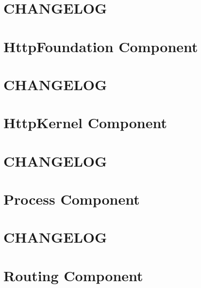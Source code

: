 \documentclass[twoside]{book}
\newcommand{\+}{\discretionary{\mbox{\scriptsize$\hookleftarrow$}}{}{}}
\begin{document}
\chapter{C\+H\+A\+N\+G\+E\+L\+O\+G}
\label{md_vendor_symfony_http-foundation__symfony__component__http_foundation__c_h_a_n_g_e_l_o_g}

\chapter{Http\+Foundation Component}
\label{md_vendor_symfony_http-foundation__symfony__component__http_foundation__r_e_a_d_m_e}

\chapter{C\+H\+A\+N\+G\+E\+L\+O\+G}
\label{md_vendor_symfony_http-kernel__symfony__component__http_kernel__c_h_a_n_g_e_l_o_g}

\chapter{Http\+Kernel Component}
\label{md_vendor_symfony_http-kernel__symfony__component__http_kernel__r_e_a_d_m_e}

\chapter{C\+H\+A\+N\+G\+E\+L\+O\+G}
\label{md_vendor_symfony_process__symfony__component__process__c_h_a_n_g_e_l_o_g}

\chapter{Process Component}
\label{md_vendor_symfony_process__symfony__component__process__r_e_a_d_m_e}

\chapter{C\+H\+A\+N\+G\+E\+L\+O\+G}
\label{md_vendor_symfony_routing__symfony__component__routing__c_h_a_n_g_e_l_o_g}

\chapter{Routing Component}
\label{md_vendor_symfony_routing__symfony__component__routing__r_e_a_d_m_e}

\end{document}
